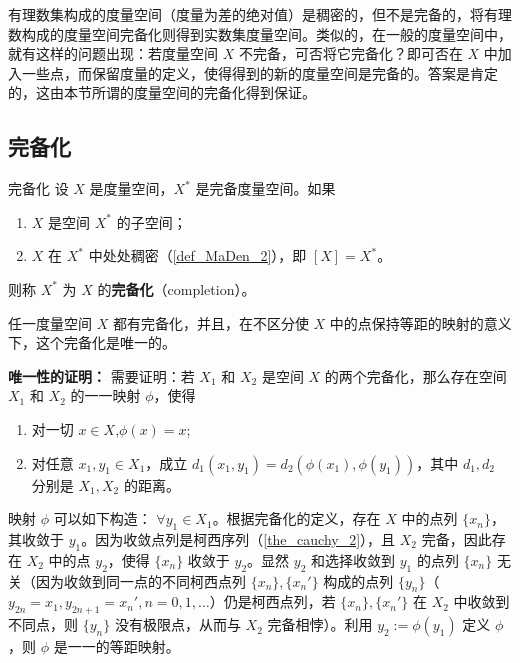 \cite{Ke1}有理数集构成的度量空间（度量为差的绝对值）是稠密的，但不是完备的，将有理数构成的度量空间完备化则得到实数集度量空间。类似的，在一般的度量空间中，就有这样的问题出现：若度量空间 $X$ 不完备，可否将它完备化？即可否在 $X$ 中加入一些点，而保留度量的定义，使得得到的新的度量空间是完备的。答案是肯定的，这由本节所谓的度量空间的完备化得到保证。

\subsection{完备化}
\begin{definition}{完备化}\label{def_SpaCom_1}
设 $X$ 是度量空间，$X^*$ 是完备度量空间。如果
\begin{enumerate}
\item $X$ 是空间 $X^*$ 的子空间；
\item $X$ 在 $X^*$ 中处处稠密（\autoref{def_MaDen_2}），即 $[X]=X^*$。
\end{enumerate}
则称 $X^*$ 为 $X$ 的\textbf{完备化}（completion）。
\end{definition}

\begin{theorem}{}
任一度量空间 $X$ 都有完备化，并且，在不区分使 $X$ 中的点保持等距的映射的意义下，这个完备化是唯一的。
\end{theorem}

\textbf{唯一性的证明：}
需要证明：若 $X_1$ 和 $X_2$ 是空间 $X$ 的两个完备化，那么存在空间 $X_1$ 和 $X_2$ 的一一映射 $\phi$，使得
\begin{enumerate}
\item 对一切 $x\in X$,$\phi(x)=x$;
\item 对任意 $x_1,y_1\in X_1$，成立 $d_1(x_1,y_1)=d_2(\phi(x_1),\phi(y_1))$，其中 $d_1,d_2$ 分别是 $X_1,X_2$ 的距离。
\end{enumerate}
映射 $\phi$ 可以如下构造： $\forall y_1\in X_1$。根据完备化的定义，存在 $X$ 中的点列 $\{x_n\}$，其收敛于 $y_1$。因为收敛点列是柯西序列（\autoref{the_cauchy_2}），且 $X_2$ 完备，因此存在 $X_2$ 中的点 $y_2$，使得 $\{x_n\}$ 收敛于 $y_2$。显然 $y_2$ 和选择收敛到 $y_1$ 的点列 $\{x_n\}$ 无关（因为收敛到同一点的不同柯西点列 $\{x_n\},\{x_n'\}$ 构成的点列 $\{y_n\}$（$y_{2n}=x_1,y_{2n+1}=x_n',n=0,1,\ldots$）仍是柯西点列，若 $\{x_n\},\{x_n'\}$ 在 $X_2$ 中收敛到不同点，则 $\{y_n\}$ 没有极限点，从而与 $X_2$ 完备相悖）。利用 $y_2:=\phi(y_1)$ 定义 $\phi$，则 $\phi$ 是一一的等距映射。

